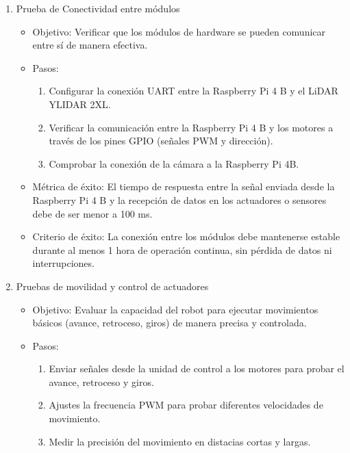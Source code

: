     \begin{enumerate}
        \item Prueba de Conectividad entre m\'odulos
        \begin{itemize}
            \item Objetivo: Verificar que los m\'odulos de hardware se pueden comunicar
                entre s\'i de manera efectiva.
            \item Pasos:
                \begin{enumerate}
                    \item Configurar la conexi\'on UART entre la Raspberry Pi 4 B y el LiDAR YLIDAR 2XL.
                    \item Verificar la comunicaci\'on entre la Raspberry Pi 4 B y los motores a trav\'es de los pines GPIO (se\~nales PWM y direcci\'on).
                    \item Comprobar la conexi\'on de la c\'amara a la Raspberry Pi 4B.
                \end{enumerate}
            \item M\'etrica de \'exito: El tiempo de respuesta entre la se\~nal enviada desde la Raspberry Pi 4 B y la 
                recepci\'on de datos en los actuadores o sensores debe de ser menor a 100 ms.
            \item Criterio de \'exito: La conexi\'on entre los m\'odulos debe mantenerse
                estable durante al menos 1 hora de operaci\'on continua, sin p\'erdida de
                datos ni interrupciones.
        \end{itemize}
        \item Pruebas de movilidad y control de actuadores
        \begin{itemize}
            \item Objetivo: Evaluar la capacidad del robot para ejecutar movimientos b\'asicos
                (avance, retroceso, giros) de manera precisa y controlada.
            \item Pasos:
                \begin{enumerate}
                    \item Enviar se\~nales desde la unidad de control a los motores para probar el avance, retroceso y giros.
                    \item Ajustes la frecuencia PWM para probar diferentes velocidades de movimiento.
                    \item Medir la precisi\'on del movimiento en distacias cortas y largas.
                \end{enumerate}

\end{itemize}
\end{enumerate}

